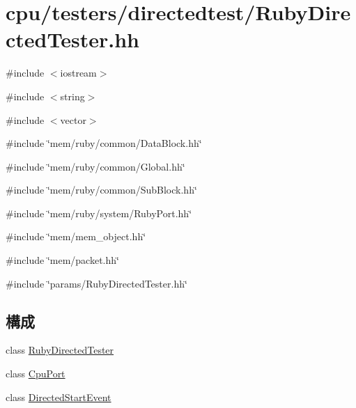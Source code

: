 \hypertarget{RubyDirectedTester_8hh}{
\section{cpu/testers/directedtest/RubyDirectedTester.hh}
\label{RubyDirectedTester_8hh}
}
{\ttfamily \#include $<$iostream$>$}\par
{\ttfamily \#include $<$string$>$}\par
{\ttfamily \#include $<$vector$>$}\par
{\ttfamily \#include \char`\"{}mem/ruby/common/DataBlock.hh\char`\"{}}\par
{\ttfamily \#include \char`\"{}mem/ruby/common/Global.hh\char`\"{}}\par
{\ttfamily \#include \char`\"{}mem/ruby/common/SubBlock.hh\char`\"{}}\par
{\ttfamily \#include \char`\"{}mem/ruby/system/RubyPort.hh\char`\"{}}\par
{\ttfamily \#include \char`\"{}mem/mem\_\-object.hh\char`\"{}}\par
{\ttfamily \#include \char`\"{}mem/packet.hh\char`\"{}}\par
{\ttfamily \#include \char`\"{}params/RubyDirectedTester.hh\char`\"{}}\par
\subsection*{構成}
\begin{DoxyCompactItemize}
\item 
class \hyperlink{classRubyDirectedTester}{RubyDirectedTester}
\item 
class \hyperlink{classRubyDirectedTester_1_1CpuPort}{CpuPort}
\item 
class \hyperlink{classRubyDirectedTester_1_1DirectedStartEvent}{DirectedStartEvent}
\end{DoxyCompactItemize}
